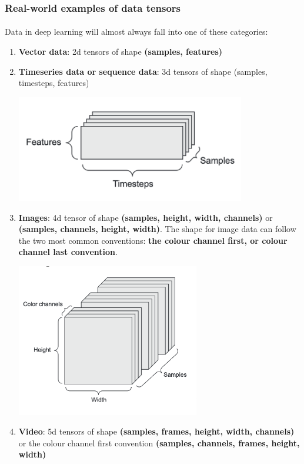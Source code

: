 \documentclass[12pt, a4paper]{article}
\begin{document}
\subsubsection{Real-world examples of data tensors}
\paragraph*{}
Data in deep learning will almost always fall into one of these categories:
\begin{enumerate}
   \item \textbf{Vector data}: 2d tensors of shape \textbf{(samples, features)}
   \item \textbf{Timeseries data or sequence data}: 3d tensors of shape 
   (samples, timesteps, features)
   {
      \centering
      \includegraphics[width=10cm]{timeseries_data.png}

   }
   \item \textbf{Images}: 4d tensor of shape \textbf{(samples, height, width, channels)}
   or \textbf{(samples, channels, height, width)}. The shape for image data can follow the two
   most common conventions: \textbf{the colour channel first, or colour channel last convention}.
   {
      \centering
      \includegraphics[width=8cm]{image_data.png}

   }
   \item \textbf{Video}: 5d tensors of shape \textbf{(samples, frames, height, width, channels)}
   or the colour channel first convention \textbf{(samples, channels, frames, height, width)}

\end{enumerate}
\end{document}
